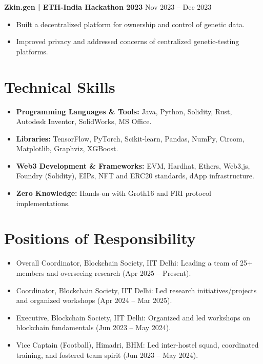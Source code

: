\documentclass[11pt,a4paper]{article}
\newcommand{\resumeSubheading}[4]{
  \textbf{#1} \hfill #2\\
  \textit{#3} \hfill \textit{#4}
}
\begin{document}
\resumeSubheading{Zkin.gen | ETH-India Hackathon 2023}{Nov 2023 -- Dec 2023}{}{}
\begin{itemize}
  \item Built a decentralized platform for ownership and control of genetic data.
  \item Improved privacy and addressed concerns of centralized genetic-testing platforms.
\end{itemize}

\section*{Technical Skills}
\begin{itemize}
  \item \textbf{Programming Languages \& Tools:} Java, Python, Solidity, Rust, Autodesk Inventor, SolidWorks, MS Office.
  \item \textbf{Libraries:} TensorFlow, PyTorch, Scikit-learn, Pandas, NumPy, Circom, Matplotlib, Graphviz, XGBoost.
  \item \textbf{Web3 Development \& Frameworks:} EVM, Hardhat, Ethers, Web3.js, Foundry (Solidity), EIPs, NFT and ERC20 standards, dApp infrastructure.
  \item \textbf{Zero Knowledge:} Hands-on with Groth16 and FRI protocol implementations.
\end{itemize}

\section*{Positions of Responsibility}
\begin{itemize}
  \item Overall Coordinator, Blockchain Society, IIT Delhi: Leading a team of 25+ members and overseeing research (Apr 2025 -- Present).
  \item Coordinator, Blockchain Society, IIT Delhi: Led research initiatives/projects and organized workshops (Apr 2024 -- Mar 2025).
  \item Executive, Blockchain Society, IIT Delhi: Organized and led workshops on blockchain fundamentals (Jun 2023 -- May 2024).
  \item Vice Captain (Football), Himadri, BHM: Led inter-hostel squad, coordinated training, and fostered team spirit (Jun 2023 -- May 2024).
\end{itemize}
\end{document}

